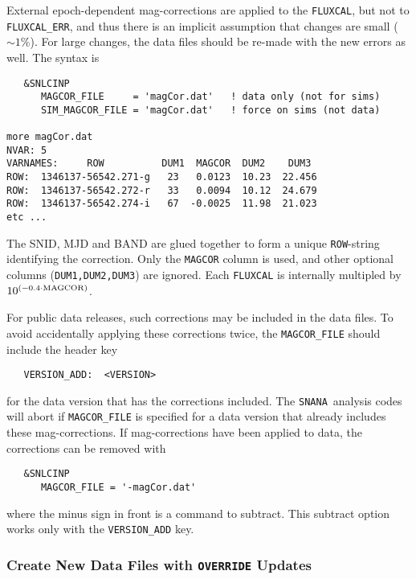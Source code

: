 \documentclass[12pt]{article}
\newcommand{\snana}{{\tt SNANA}}
\begin{document}
External epoch-dependent mag-corrections are applied to the {\tt FLUXCAL}, 
but not to {\tt FLUXCAL\_ERR},
and thus there is an implicit assumption that changes
are small ($\sim 1$\%).
For large changes, the data files should be re-made 
with the new errors as well. The syntax is
%
\begin{verbatim}
   &SNLCINP
      MAGCOR_FILE     = 'magCor.dat'   ! data only (not for sims)
      SIM_MAGCOR_FILE = 'magCor.dat'   ! force on sims (not data)

more magCor.dat
NVAR: 5
VARNAMES:     ROW          DUM1  MAGCOR  DUM2    DUM3
ROW:  1346137-56542.271-g   23   0.0123  10.23  22.456
ROW:  1346137-56542.272-r   33   0.0094  10.12  24.679
ROW:  1346137-56542.274-i   67  -0.0025  11.98  21.023
etc ...
\end{verbatim}
The SNID, MJD and BAND are glued together to form
a unique {\tt ROW}-string identifying the correction. 
Only the {\tt MAGCOR} column is used, and other optional
columns ({\tt DUM1,DUM2,DUM3}) are ignored.
Each {\tt FLUXCAL} is internally multipled by 
$10^{(-0.4\cdot {\rm MAGCOR})}$.

For public data releases, such corrections may be included
in the data files. To avoid accidentally applying these
corrections twice, the {\tt MAGCOR\_FILE} should include
the header key
\begin{verbatim}
   VERSION_ADD:  <VERSION>
\end{verbatim}
%
for the data version that has the corrections included.
The \snana\ analysis codes will abort if {\tt MAGCOR\_FILE}
is specified for a data version that already includes these
mag-corrections.   
If mag-corrections have been applied to data,
the corrections can be removed with 
\begin{verbatim}
   &SNLCINP
      MAGCOR_FILE = '-magCor.dat'
\end{verbatim}
%
where the minus sign in front is a command to subtract.
This subtract option works only with the {\tt VERSION\_ADD} key.


\subsubsection{Create New Data Files with {\tt OVERRIDE} Updates}
\label{sss:new_data_files}
\end{document}
